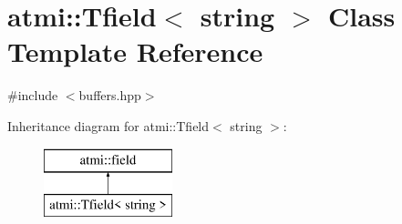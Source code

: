 \hypertarget{classatmi_1_1_tfield_3_01string_01_4}{\section{atmi\+:\+:Tfield$<$ string $>$ Class Template Reference}
\label{classatmi_1_1_tfield_3_01string_01_4}
}


{\ttfamily \#include $<$buffers.\+hpp$>$}

Inheritance diagram for atmi\+:\+:Tfield$<$ string $>$\+:\begin{figure}[H]
\begin{center}
\leavevmode
\includegraphics[height=2.000000cm]{classatmi_1_1_tfield_3_01string_01_4}
\end{center}
\end{figure}
